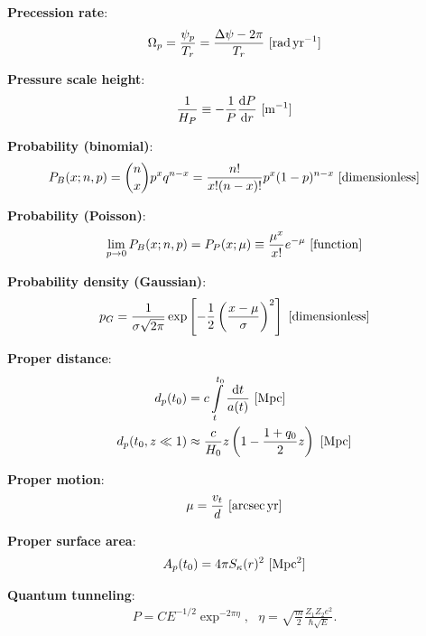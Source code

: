 \documentclass[a4paper,10pt]{article}
\begin{document}
{\noindent}\textbf{Precession rate}:
\begin{align*}
    \Omega_p = \frac{\psi_p}{T_r} = \frac{\Delta\psi-2\pi}{T_r} ~ [{\rm rad\,yr^{-1}}]
\end{align*}

{\noindent}\textbf{Pressure scale height}:
\begin{align*}
    \frac{1}{H_P} \equiv -\frac{1}{P}\frac{{\rm d}P}{{\rm d}r} ~ [{\rm m^{-1}}]
\end{align*}

{\noindent}\textbf{Probability (binomial)}:
\begin{align*}
    P_B(x;n,p) = \binom{n}{x}p^xq^{n-x} = \frac{n!}{x!(n-x)!}p^x(1-p)^{n-x} ~ [{\rm dimensionless}]
\end{align*}

{\noindent}\textbf{Probability (Poisson)}:
\begin{align*}
    \lim_{p\rightarrow0}P_B(x;n,p) = P_P(x;\mu) \equiv \frac{\mu^x}{x!}e^{-\mu} ~ [{\rm function}]
\end{align*}

{\noindent}\textbf{Probability density (Gaussian)}:
\begin{align*}
    p_G = \frac{1}{\sigma\sqrt{2\pi}}\exp \left[-\frac{1}{2} \left(\frac{x-\mu}{\sigma}\right)^2 \right] ~ [{\rm dimensionless}]
\end{align*}

{\noindent}\textbf{Proper distance}:
\begin{align*}
    d_p(t_0) &= c\int\limits_t^{t_0}\frac{\mathrm{d}t}{a(t)} ~ [{\rm Mpc}] \\
    d_p(t_0,z\ll1) &\approx \frac{c}{H_0}z \left(1-\frac{1+q_0}{2}z\right) ~ [{\rm Mpc}]
\end{align*}

{\noindent}\textbf{Proper motion}:
\begin{align*}
    \mu = \frac{v_t}{d} ~ [{\rm arcsec\,yr}]
\end{align*}

{\noindent}\textbf{Proper surface area}:
\begin{align*}
    A_p(t_0) = 4\pi S_\kappa(r)^2 ~ [{\rm Mpc^2}]
\end{align*}

{\noindent}\textbf{Quantum tunneling}:
\begin{align*}
    P = CE^{-1/2}\exp^{-2\pi\eta}, ~~~ \eta=\sqrt{\frac{m}{2}}\frac{Z_1Z_2e^2}{\hbar\sqrt{E}}.
\end{align*}
\end{document}
